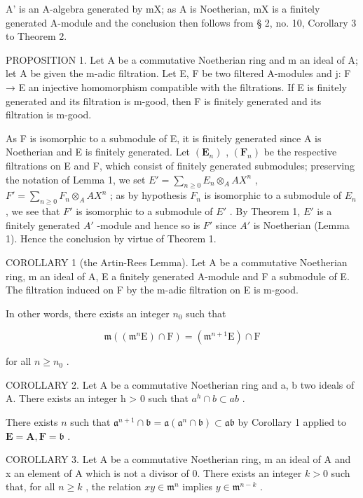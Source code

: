 A' is an A-algebra generated by mX; as A is Noetherian, mX is a finitely generated A-module and the conclusion then follows from § 2, no. 10, Corollary 3 to Theorem 2.

PROPOSITION 1. Let A be a commutative Noetherian ring and m an ideal of A; let A be given the m-adic filtration. Let E, F be two filtered A-modules and j: F → E an injective homomorphism compatible with the filtrations. If E is finitely generated and its filtration is m-good, then F is finitely generated and its filtration is m-good.

As F is isomorphic to a submodule of E, it is finitely generated since A is Noetherian and E is finitely generated. Let \((\mathbf{E}_{n})\) , \((\mathbf{F}_{n})\) be the respective filtrations on E and F, which consist of finitely generated submodules; preserving the notation of Lemma 1, we set \(E' = \sum_{n \geqslant 0} E_{n} \otimes_{A} AX^{n}\) , \(F' = \sum_{n \geqslant 0} F_{n} \otimes_{A} AX^{n}\) ; as by hypothesis \(F_{n}\) is isomorphic to a submodule of \(E_{n}\) , we see that \(F'\) is isomorphic to a submodule of \(E'\) . By Theorem 1, \(E'\) is a finitely generated \(A'\) -module and hence so is \(F'\) since \(A'\) is Noetherian (Lemma 1). Hence the conclusion by virtue of Theorem 1.

COROLLARY 1 (the Artin-Rees Lemma). Let A be a commutative Noetherian ring, m an ideal of A, E a finitely generated A-module and F a submodule of E. The filtration induced on F by the m-adic filtration on E is m-good.

In other words, there exists an integer \(n_{0}\) such that

\[
\mathfrak {m} ((\mathfrak {m} ^ {n} \mathrm{E}) \cap \mathrm{F}) = (\mathfrak {m} ^ {n + 1} \mathrm{E}) \cap \mathrm{F}\tag{1}
\]

for all \(n \geqslant n_0\) .

COROLLARY 2. Let A be a commutative Noetherian ring and a, b two ideals of A. There exists an integer h \textgreater{} 0 such that \(a^{h} \cap b \subset ab\) .

There exists \(n\) such that \(\mathfrak{a}^{n+1} \cap \mathfrak{b} = \mathfrak{a}(\mathfrak{a}^n \cap \mathfrak{b}) \subset \mathfrak{ab}\) by Corollary 1 applied to \(\mathbf{E} = \mathbf{A}, \mathbf{F} = \mathfrak{b}\) .

COROLLARY 3. Let A be a commutative Noetherian ring, m an ideal of A and x an element of A which is not a divisor of 0. There exists an integer \(k > 0\) such that, for all \(n \geqslant k\) , the relation \(xy \in \mathfrak{m}^n\) implies \(y \in \mathfrak{m}^{n - k}\) .

